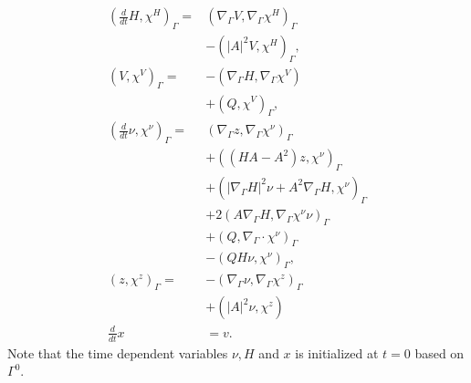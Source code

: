 \begin{subequations}
\label{eq:WE_weak_form}
\begin{align}
\left( \frac{d}{dt}H, \chi ^{H} \right)_{\Gamma } =&  \left( \nabla _{\Gamma } V, \nabla _{\Gamma }\chi ^{H} \right) _{\Gamma } \nonumber \\
                                                   &- \left( \left\lvert A \right\rvert ^2 V, \chi ^{H} \right) _{\Gamma },   \\
\left( V, \chi ^{V} \right)_{\Gamma } =& -\left( \nabla _{\Gamma } H, \nabla _{\Gamma } \chi ^{V} \right) \nonumber \\
 & + \left( Q, \chi ^{V} \right)_{\Gamma },   \\
\left( \frac{d}{dt} \nu , \chi ^{\nu } \right)_{\Gamma } =& \left( \nabla _{\Gamma }z, \nabla _{\Gamma } \chi ^{\nu } \right) _{\Gamma }\nonumber   \\
 & + \left( ( HA - A^2  )z,\chi^\nu  \right)_{\Gamma }   \nonumber \\
 & + \left( \left\lvert \nabla _{\Gamma } H \right\rvert^2 \nu + A^2\nabla _{\Gamma } H, \chi ^{\nu }  \right)_{\Gamma} \nonumber  \\
 & + 2 \left( A \nabla _{\Gamma } H, \nabla _{\Gamma } \chi ^{\nu } \nu  \right)_{\Gamma} \nonumber    \\
 &  + \left( Q, \nabla _{\Gamma } \cdot \chi ^{\nu }  \right)_{\Gamma } \nonumber  \\
  &- \left( QH\nu , \chi ^{\nu } \right) _{\Gamma},\\
\left( z, \chi ^{z} \right) _{\Gamma }  =& - \left( \nabla _{\Gamma } \nu , \nabla _{\Gamma } \chi ^{z} \right)_{\Gamma} \nonumber \\
 & + \left( \left\lvert A \right\rvert ^2 \nu , \chi ^{z} \right) \\
\frac{d}{dt}x &= v
.\end{align}
\end{subequations}
Note that the time dependent variables $\nu, H $ and $x$ is initialized at $t=0$  based on $\Gamma ^{0}$.














